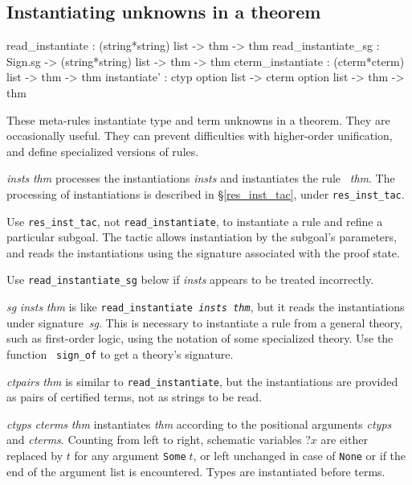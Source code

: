 \subsection{Instantiating unknowns in a theorem} \label{sec:instantiate}
\begin{ttbox}
read_instantiate    :                (string*string) list -> thm -> thm
read_instantiate_sg :     Sign.sg -> (string*string) list -> thm -> thm
cterm_instantiate   :                  (cterm*cterm) list -> thm -> thm
instantiate'      : ctyp option list -> cterm option list -> thm -> thm
\end{ttbox}
These meta-rules instantiate type and term unknowns in a theorem.  They are
occasionally useful.  They can prevent difficulties with higher-order
unification, and define specialized versions of rules.
\begin{ttdescription}
\item[\ttindexbold{read_instantiate} {\it insts} {\it thm}] 
processes the instantiations {\it insts} and instantiates the rule~{\it
thm}.  The processing of instantiations is described
in \S\ref{res_inst_tac}, under {\tt res_inst_tac}.  

Use {\tt res_inst_tac}, not {\tt read_instantiate}, to instantiate a rule
and refine a particular subgoal.  The tactic allows instantiation by the
subgoal's parameters, and reads the instantiations using the signature
associated with the proof state.

Use {\tt read_instantiate_sg} below if {\it insts\/} appears to be treated
incorrectly.

\item[\ttindexbold{read_instantiate_sg} {\it sg} {\it insts} {\it thm}]
  is like \texttt{read_instantiate {\it insts}~{\it thm}}, but it reads
  the instantiations under signature~{\it sg}.  This is necessary to
  instantiate a rule from a general theory, such as first-order logic,
  using the notation of some specialized theory.  Use the function {\tt
    sign_of} to get a theory's signature.

\item[\ttindexbold{cterm_instantiate} {\it ctpairs} {\it thm}] 
is similar to {\tt read_instantiate}, but the instantiations are provided
as pairs of certified terms, not as strings to be read.

\item[\ttindexbold{instantiate'} {\it ctyps} {\it cterms} {\it thm}]
  instantiates {\it thm} according to the positional arguments {\it
    ctyps} and {\it cterms}.  Counting from left to right, schematic
  variables $?x$ are either replaced by $t$ for any argument
  \texttt{Some\(\;t\)}, or left unchanged in case of \texttt{None} or
  if the end of the argument list is encountered.  Types are
  instantiated before terms.

\end{ttdescription}


